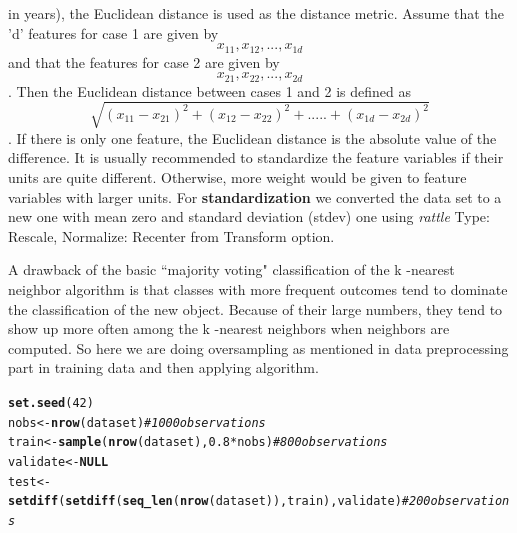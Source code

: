\documentclass{article}\usepackage[]{graphicx}\usepackage[]{color}
\makeatletter
\newcommand{\hlnum}[1]{\textcolor[rgb]{0.686,0.059,0.569}{#1}}%
\newcommand{\hlcom}[1]{\textcolor[rgb]{0.678,0.584,0.686}{\textit{#1}}}%
\newcommand{\hlopt}[1]{\textcolor[rgb]{0,0,0}{#1}}%
\newcommand{\hlstd}[1]{\textcolor[rgb]{0.345,0.345,0.345}{#1}}%
\newcommand{\hlkwa}[1]{\textcolor[rgb]{0.161,0.373,0.58}{\textbf{#1}}}%
\newcommand{\hlkwb}[1]{\textcolor[rgb]{0.69,0.353,0.396}{#1}}%
\newcommand{\hlkwd}[1]{\textcolor[rgb]{0.737,0.353,0.396}{\textbf{#1}}}%
\newenvironment{kframe}{%
 \def\at@end@of@kframe{}%
 \ifinner\ifhmode%
  \def\at@end@of@kframe{\end{minipage}}%
  \begin{minipage}{\columnwidth}%
 \fi\fi%
 \def\FrameCommand##1{\hskip\@totalleftmargin \hskip-\fboxsep
 \colorbox{shadecolor}{##1}\hskip-\fboxsep
     \hskip-\linewidth \hskip-\@totalleftmargin \hskip\columnwidth}%
 \MakeFramed {\advance\hsize-\width
   \@totalleftmargin\z@ \linewidth\hsize
   \@setminipage}}%
 {\par\unskip\endMakeFramed%
 \at@end@of@kframe}
\newenvironment{knitrout}{}{} %
\makeatother
\begin{document}
in years), the Euclidean distance is used as the distance metric. Assume that the 'd' features for case 1 are given by 
\begin{equation}x_{11}, x_{12} , . . . , x_{1d}\end{equation} and that the features for case 2 are given by \begin{equation}x_{21}, x_{22} , . . . , x_{2d}\end{equation}. Then the Euclidean distance between cases 1 and 2 is defined as \begin{equation}\sqrt{(x_{11} - x_{21})^2 + (x_{12} - x_{22})^2 + ..... + (x_{1d} - x_{2d})^2}\end{equation}. If there is only one feature, the Euclidean distance is the absolute value of the difference. It is usually recommended to standardize the feature variables if their units are quite different. Otherwise, more weight would be given to feature variables with larger units. For \textbf{standardization} we converted the data set to a new one with mean zero and standard deviation (stdev) one using \textit{rattle} Type: Rescale, Normalize: Recenter from Transform option. \par
\hspace{0.5cm}A drawback of the basic ``majority voting" classification of the k -nearest neighbor algorithm is that classes with more frequent outcomes tend to dominate the classification of the new object. Because of their large numbers, they tend to show up more often among the k -nearest neighbors when neighbors are computed. So here we are doing oversampling as mentioned in data preprocessing part in training data and then applying algorithm.

\begin{knitrout}
\color{fgcolor}\begin{kframe}
\begin{alltt}
\hlkwd{set.seed}\hlstd{(}\hlnum{42}\hlstd{)}
\hlstd{nobs} \hlkwb{<-} \hlkwd{nrow}\hlstd{(dataset)} \hlcom{# 1000 observations}
\hlstd{train} \hlkwb{<-} \hlkwd{sample}\hlstd{(}\hlkwd{nrow}\hlstd{(dataset),} \hlnum{0.8}\hlopt{*}\hlstd{nobs)} \hlcom{# 800 observations}
\hlstd{validate} \hlkwb{<-} \hlkwa{NULL}
\hlstd{test} \hlkwb{<-} \hlkwd{setdiff}\hlstd{(}\hlkwd{setdiff}\hlstd{(}\hlkwd{seq_len}\hlstd{(}\hlkwd{nrow}\hlstd{(dataset)), train), validate)} \hlcom{# 200 observations}
\end{alltt}
\end{kframe}
\end{knitrout}
\end{document}
